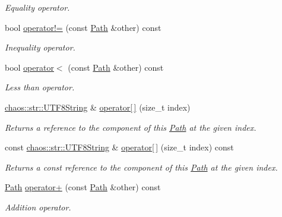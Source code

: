 \begin{DoxyCompactItemize}
\begin{DoxyCompactList}\small\item\em Equality operator. \end{DoxyCompactList}\item 
bool \hyperlink{classchaos_1_1io_1_1file_1_1_path_a6aedff03f22270cdcfb9456ec6864fdd}{operator!=} (const \hyperlink{classchaos_1_1io_1_1file_1_1_path}{Path} \&other) const 
\begin{DoxyCompactList}\small\item\em Inequality operator. \end{DoxyCompactList}\item 
bool \hyperlink{classchaos_1_1io_1_1file_1_1_path_a75296f65ccebe075504744bb01218ac9}{operator$<$} (const \hyperlink{classchaos_1_1io_1_1file_1_1_path}{Path} \&other) const 
\begin{DoxyCompactList}\small\item\em Less than operator. \end{DoxyCompactList}\item 
\hyperlink{classchaos_1_1str_1_1_u_t_f8_string}{chaos\-::str\-::\-U\-T\-F8\-String} \& \hyperlink{classchaos_1_1io_1_1file_1_1_path_a5bdb98733f0961e8dd798904fad1dbbf}{operator\mbox{[}$\,$\mbox{]}} (size\-\_\-t index)
\begin{DoxyCompactList}\small\item\em Returns a reference to the component of this \hyperlink{classchaos_1_1io_1_1file_1_1_path}{Path} at the given index. \end{DoxyCompactList}\item 
const \hyperlink{classchaos_1_1str_1_1_u_t_f8_string}{chaos\-::str\-::\-U\-T\-F8\-String} \& \hyperlink{classchaos_1_1io_1_1file_1_1_path_ade01a60714a2206c6c46ab5a635b6c42}{operator\mbox{[}$\,$\mbox{]}} (size\-\_\-t index) const 
\begin{DoxyCompactList}\small\item\em Returns a const reference to the component of this \hyperlink{classchaos_1_1io_1_1file_1_1_path}{Path} at the given index. \end{DoxyCompactList}\item 
\hyperlink{classchaos_1_1io_1_1file_1_1_path}{Path} \hyperlink{classchaos_1_1io_1_1file_1_1_path_aa50a4cd5e59861d5f92050e13fb1a9ce}{operator+} (const \hyperlink{classchaos_1_1io_1_1file_1_1_path}{Path} \&other) const 
\begin{DoxyCompactList}\small\item\em Addition operator. \end{DoxyCompactList}\item 

\end{DoxyCompactItemize}
